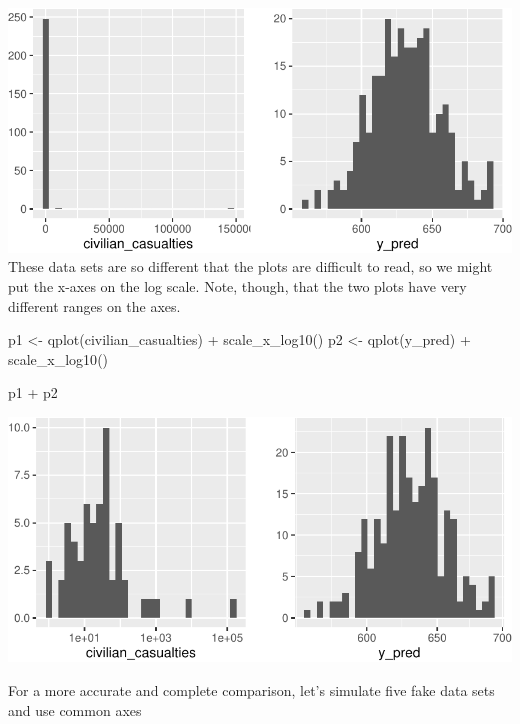 \documentclass[
]{book}
\newenvironment{Shaded}{\begin{snugshade}}{\end{snugshade}}
\newcommand{\FunctionTok}[1]{\textcolor[rgb]{0.00,0.00,0.00}{#1}}
\newcommand{\NormalTok}[1]{#1}
\newcommand{\OtherTok}[1]{\textcolor[rgb]{0.56,0.35,0.01}{#1}}
\newcommand{\SpecialCharTok}[1]{\textcolor[rgb]{0.00,0.00,0.00}{#1}}
\begin{document}
\includegraphics{01-05-predictive-distribution_files/figure-latex/unnamed-chunk-4-1.pdf}
These data sets are so different that the plots are difficult to read, so we might put the x-axes on the log scale. Note, though, that the two plots have very different ranges on the axes.

\begin{Shaded}
\begin{Highlighting}[]
\NormalTok{p1 }\OtherTok{\textless{}{-}} \FunctionTok{qplot}\NormalTok{(civilian\_casualties) }\SpecialCharTok{+} \FunctionTok{scale\_x\_log10}\NormalTok{()}
\NormalTok{p2 }\OtherTok{\textless{}{-}} \FunctionTok{qplot}\NormalTok{(y\_pred) }\SpecialCharTok{+} \FunctionTok{scale\_x\_log10}\NormalTok{()}

\NormalTok{p1 }\SpecialCharTok{+}\NormalTok{ p2}
\end{Highlighting}
\end{Shaded}

\includegraphics{01-05-predictive-distribution_files/figure-latex/unnamed-chunk-5-1.pdf}

For a more accurate and complete comparison, let's simulate five fake data sets and use common axes
\end{document}
